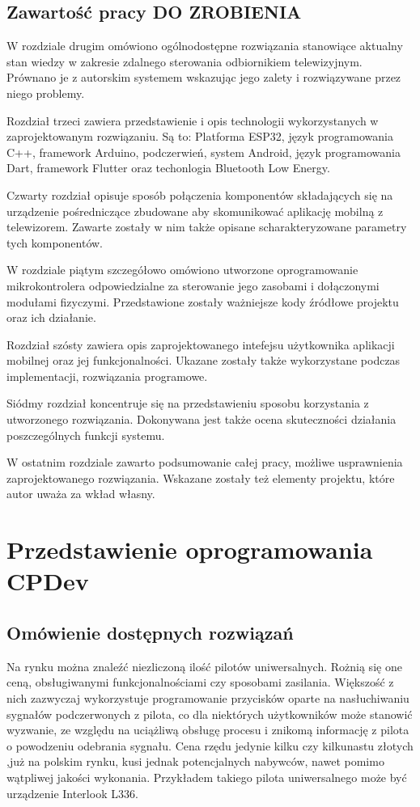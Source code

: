 \documentclass[12pt,twoside]{article}
\begin{document}
\subsection{Zawartość pracy DO ZROBIENIA}
W rozdziale drugim  omówiono ogólnodostępne rozwiązania stanowiące aktualny stan wiedzy w zakresie zdalnego sterowania odbiornikiem telewizyjnym. Prównano je z autorskim systemem wskazując jego zalety i rozwiązywane przez niego problemy.

Rozdział trzeci zawiera przedstawienie i opis technologii wykorzystanych w zaprojektowanym rozwiązaniu. Są to: Platforma ESP32, język programowania C++, framework Arduino, podczerwień, system Android, język programowania Dart, framework Flutter oraz techonlogia Bluetooth Low Energy.

Czwarty rozdział opisuje sposób połączenia komponentów składających się na urządzenie pośredniczące zbudowane aby skomunikować aplikację mobilną z telewizorem. Zawarte zostały w nim także opisane scharakteryzowane parametry tych komponentów.

W rozdziale piątym szczegółowo omówiono utworzone oprogramowanie mikrokontrolera odpowiedzialne za sterowanie jego zasobami i dołączonymi modułami fizyczymi. Przedstawione zostały ważniejsze kody źródłowe projektu oraz ich działanie.

Rozdział szósty zawiera opis zaprojektowanego intefejsu użytkownika aplikacji mobilnej oraz jej funkcjonalności. Ukazane zostały także wykorzystane podczas implementacji, rozwiązania programowe.

Siódmy rozdział koncentruje się na przedstawieniu sposobu korzystania z utworzonego rozwiązania. Dokonywana jest także ocena skuteczności działania poszczególnych funkcji systemu.

W ostatnim rozdziale zawarto podsumowanie całej pracy, możliwe usprawnienia zaprojektowanego rozwiązania. Wskazane zostały też elementy projektu, które autor uważa za wkład własny.


\clearpage
\section{Przedstawienie oprogramowania CPDev}
\subsection{Omówienie dostępnych rozwiązań}
Na rynku można znaleźć niezliczoną ilość pilotów uniwersalnych. Rożnią się one
ceną, obsługiwanymi funkcjonalnościami czy sposobami zasilania. Większość z nich zazwyczaj
wykorzystuje programowanie przycisków oparte na nasłuchiwaniu sygnałów podczerwonych z pilota, co dla niektórych użytkowników może stanowić
wyzwanie, ze względu na uciążliwą obsługę procesu i znikomą informację z pilota o powodzeniu odebrania sygnału. Cena rzędu jedynie kilku czy kilkunastu złotych
,już na polskim rynku, kusi jednak potencjalnych nabywców, nawet pomimo wątpliwej jakości wykonania. Przykładem
takiego pilota uniwersalnego może być urządzenie Interlook L336\cite{cheapController}.
\end{document}

